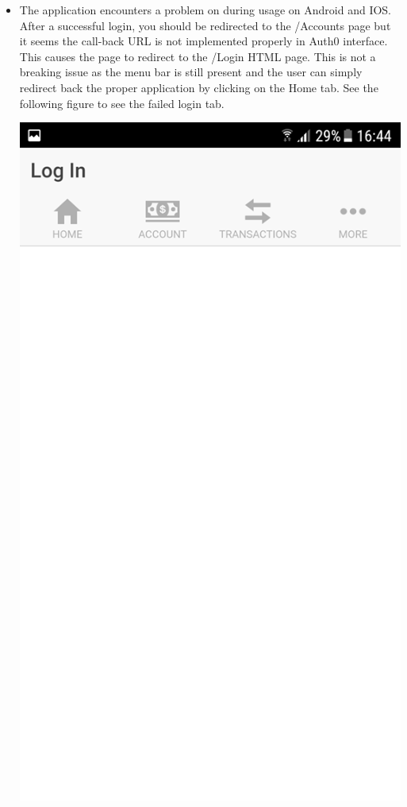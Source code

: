 \begin{itemize}
    \item The application encounters a problem on during usage on Android and IOS. After a successful login, you should be redirected to the /Accounts page but it seems the call-back URL is not implemented properly in Auth0 interface. This causes the page to redirect to the /Login HTML page. This is not a breaking issue as the menu bar is still present and the user can simply redirect back the proper application by clicking on the Home tab.
    See the following figure to see the failed login tab.
    \begin{center}
      \includegraphics[scale=0.25]{img/4logingonewrong.png}

\end{center}
\end{itemize}
